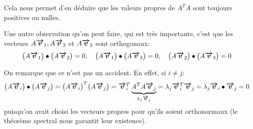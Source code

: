 \documentclass[a4paper]{article}
\begin{document}
{    Cela nous permet d'en déduire que les valeurs propres de $A^T A$ sont toujours positives ou nulles.

    Une autre observation qu'on peut faire, qui est très importante, c'est que les vecteurs $A \bm{\protect\overrightarrow{v}}_1, A \bm{\protect\overrightarrow{v}}_2$ et $A \bm{\protect\overrightarrow{v}}_3$ sont orthogonaux: 
    \[\left(A \bvec{v}_1\right) \dotprod \left(A \bvec{v}_2\right) = 0, \mathspace \left(A \bvec{v}_1\right) \dotprod \left(A \bvec{v}_3\right) = 0, \mathspace \left(A \bvec{v}_2\right) \dotprod \left(A \bvec{v}_3\right) =  0\]
    
    On remarque que ce n'est pas un accident. En effet, si $i \neq j$: 
    \[\left(A \bvec{v}_i\right) \dotprod \left(A \bvec{v}_j\right) = \left(A \bvec{v}_i\right)^T \left(A \bvec{v}_j\right) = \bvec{v}_i^T \underbrace{A^T A \bvec{v}_j}_{\lambda_j \bvec{v}_j} = \lambda_j \bvec{v}_i^T \bvec{v}_j = \lambda_j \bvec{v}_i \dotprod \bvec{v}_j = 0\]
    puisqu'on avait choisi les vecteurs propres pour qu'ils soient orthonormaux (le théorème spectral nous garantit leur existence). 
    
}
\end{document}
